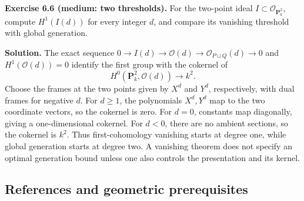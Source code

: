 \documentclass[11pt]{article}
\begin{document}
\textbf{Exercise 6.6 (medium: two thresholds).} For the two-point ideal
\(I\subset\mathcal O_{\mathbf P_k^2}\), compute \(H^1(I(d))\) for every
integer \(d\), and compare its vanishing threshold with global
generation.

\textbf{Solution.} The exact sequence
\(0\to I(d)\to\mathcal O(d)\to\mathcal O_{P\sqcup Q}(d)\to0\) and
\(H^1(\mathcal O(d))=0\) identify the first group with the cokernel of
\[
H^0(\mathbf P_k^2,\mathcal O(d))\longrightarrow k^2.
\] Choose the frames at the two points given by \(X^d\) and \(Y^d\),
respectively, with dual frames for negative \(d\). For \(d\ge1\), the
polynomials \(X^d,Y^d\) map to the two coordinate vectors, so the
cokernel is zero. For \(d=0\), constants map diagonally, giving a
one-dimensional cokernel. For \(d<0\), there are no ambient sections, so
the cokernel is \(k^2\). Thus first-cohomology vanishing starts at
degree one, while global generation starts at degree two. A vanishing
theorem does not specify an optimal generation bound unless one also
controls the presentation and its kernel.

\subsection{References and geometric
prerequisites}\label{references-and-geometric-prerequisites}
\end{document}

